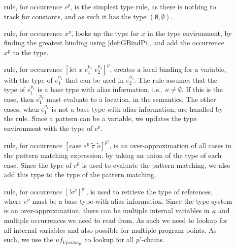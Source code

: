 \documentclass[acmsmall,sigplan]{acmart}
\begin{document}
\begin{description}
	\item[] rule, for occurrence $c^p$, is the simplest type rule, as there is nothing to track for constants, and as such it has the type $(\emptyset,\emptyset)$.

	\item[] rule, for occurrence $x^p$, looks up the type for $x$ in the type environment, by finding the greatest binding using \cref{def:GBindPi}, and add the occurrence $x^p$ to the type.

	\item[] rule, for occurrence $[\mbox{let}\;x\;e_1^{p_1}\;e_2^{p_2}]^p$, creates a local binding for a variable, with the type of $e_1^{p_1}$ that can be used in $e_2^{p_2}$.
		The  rule assumes that the type of $e_1^{p_1}$ is a base type with alias information, i.e., $\kappa\neq\emptyset$.
		If this is the case, then $e_1^{p_1}$ must evaluate to a location, in the semantics.
		The other cases, when $e_1^{p_1}$ is not a base type with alias information, are handled by the  rule.
		Since a pattern can be a variable, we updates the type environment with the type of $e^p$.

	\item[] rule, for occurrence $[\mbox{case}\;e^{p}\;\tilde{\pi}\;\tilde{o}]^{p'}$, is an over-approximation of all cases in the pattern matching expression, by taking an union of the type of each case.
		Since the type of $e^p$ is used to evaluate the pattern matching, we also add this type to the type of the pattern matching.

	\item[] rule, for occurrence $[!e^{p}]^{p'}$, is used to retrieve the type of references, where $e^p$ must be a base type with alias information.
		Since the type system is an over-approximation, there can be multiple internal variables in $\kappa$ and multiple occurrences we need to read from.
		As such we need to lookup for all internal variables and also possible for multiple program points.
		As such, we use the $uf_{Upsilon_{p'}}$ to lookup for all $p'$-chains.
\end{description}

\end{document}
